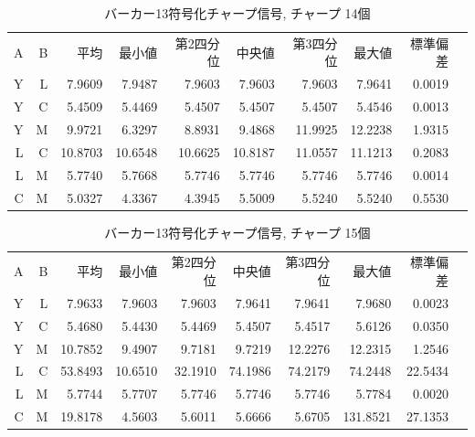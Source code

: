 \begin{table}[p]\centering
  \caption{バーカー13符号化チャープ信号, チャープ 14個}
  \label{tab:hikaku13}
  \begin{tabular}{rrrrrrrrrr}
    \hline
     A & B & 平均 & 最小値 & 第2四分位 & 中央値 & 第3四分位 & 最大値 & 標準偏差 \\
     Y & L & 7.9609 & 7.9487 & 7.9603 & 7.9603 & 7.9603 & 7.9641 & 0.0019 \\
     Y & C & 5.4509 & 5.4469 & 5.4507 & 5.4507 & 5.4507 & 5.4546 & 0.0013 \\
     Y & M & 9.9721 & 6.3297 & 8.8931 & 9.4868 & 11.9925 & 12.2238 & 1.9315 \\
     L & C & 10.8703 & 10.6548 & 10.6625 & 10.8187 & 11.0557 & 11.1213 & 0.2083 \\
     L & M & 5.7740 & 5.7668 & 5.7746 & 5.7746 & 5.7746 & 5.7746 & 0.0014 \\
     C & M & 5.0327 & 4.3367 & 4.3945 & 5.5009 & 5.5240 & 5.5240 & 0.5530 \\
    \hline
  \end{tabular}
\end{table}

\begin{table}[p]\centering
  \caption{バーカー13符号化チャープ信号, チャープ 15個}
  \label{tab:hikaku14}
  \begin{tabular}{rrrrrrrrrr}
    \hline
     A & B & 平均 & 最小値 & 第2四分位 & 中央値 & 第3四分位 & 最大値 & 標準偏差 \\
     Y & L & 7.9633 & 7.9603 & 7.9603 & 7.9641 & 7.9641 & 7.9680 & 0.0023 \\
     Y & C & 5.4680 & 5.4430 & 5.4469 & 5.4507 & 5.4517 & 5.6126 & 0.0350 \\
     Y & M & 10.7852 & 9.4907 & 9.7181 & 9.7219 & 12.2276 & 12.2315 & 1.2546 \\
     L & C & 53.8493 & 10.6510 & 32.1910 & 74.1986 & 74.2179 & 74.2448 & 22.5434 \\
     L & M & 5.7744 & 5.7707 & 5.7746 & 5.7746 & 5.7746 & 5.7784 & 0.0020 \\
     C & M & 19.8178 & 4.5603 & 5.6011 & 5.6666 & 5.6705 & 131.8521 & 27.1353 \\
    \hline
  \end{tabular}
\end{table}



\clearpage




